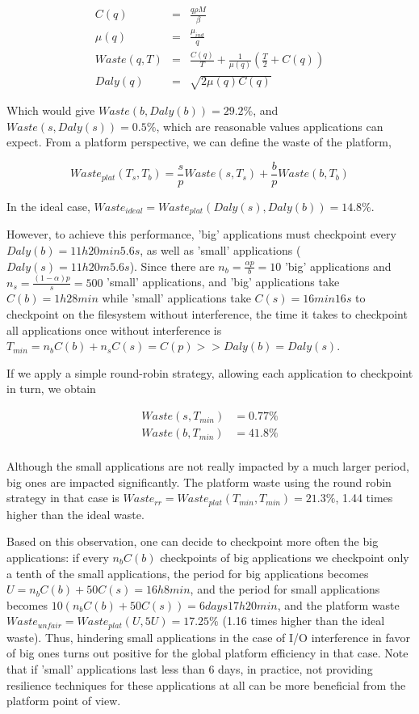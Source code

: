 \documentclass{article}
\begin{document}
\begin{eqnarray}
C(q) &=& \frac{q\rho M}{\beta}\\
\mu(q) &=& \frac{\mu_{ind}}{q}\\
Waste(q, T) &=& \frac{C(q)}{T} + \frac{1}{\mu(q)}\left(\frac{T}{2}+C(q)\right)\\
Daly(q) &=& \sqrt{2\mu(q)C(q)}
\end{eqnarray}

Which would give $Waste(b, Daly(b)) = 29.2\%$, and $Waste(s, Daly(s)) = 0.5\%$, which are reasonable values applications can expect. From a platform perspective, we can define the waste of the platform, 

$$Waste_{plat}(T_s, T_b) = \frac{s}{p}Waste(s, T_s) + \frac{b}{p}Waste(b, T_b)$$

In the ideal case, $Waste_{ideal} = Waste_{plat}(Daly(s), Daly(b)) = 14.8\%$.

However, to achieve this performance, 'big' applications must checkpoint every $Daly(b) = 11h20min5.6s$, as well as 'small' applications ($Daly(s) = 11h20m5.6s$). Since there are $n_b = \frac{\alpha p}{b} = 10$ 'big' applications and $n_s = \frac{(1-\alpha)p}{s} = 500$ 'small' applications, and 'big' applications take $C(b) = 1h28min$ while 'small' applications take $C(s) = 16min16s$ to checkpoint on the filesystem without interference, the time it takes to checkpoint all applications once without interference is $T_{min} = n_bC(b) + n_sC(s) = C(p) >> Daly(b) = Daly(s)$.

If we apply a simple round-robin strategy, allowing each application to checkpoint in turn, we obtain

$$
\begin{array}{rl}
Waste(s, T_{min}) &= 0.77\%\\
Waste(b, T_{min}) &= 41.8\%\\
\end{array}
$$

Although the small applications are not really impacted by a much larger period, big ones are impacted significantly. The platform waste using the round robin strategy in that case is $Waste_{rr} = Waste_{plat}(T_{min}, T_{min}) = 21.3\%$, 1.44 times higher than the ideal waste.

Based on this observation, one can decide to checkpoint more often the big applications: if every $n_bC(b)$ checkpoints of big applications we checkpoint only a tenth of the small applications, the period for big applications becomes $U = n_bC(b)+50C(s) = 16h8min$, and the period for small applications becomes $10(n_bC(b)+50C(s)) = 6 days 17h 20min$, and the platform waste $Waste_{unfair} = Waste_{plat}(U, 5U) = 17.25\%$ (1.16 times higher than the ideal waste). Thus, hindering small applications in the case of I/O interference in favor of big ones turns out positive for the global platform efficiency in that case. Note that if 'small' applications last less than 6 days, in practice, not providing resilience techniques for these applications at all can be more beneficial from the platform point of view.
\end{document}
